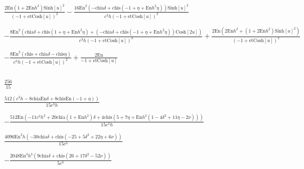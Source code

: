 \documentclass{article}
\begin{document}
\begin{doublespace}
\noindent\(\frac{2 \text{En} \left(1+2 \text{En} h^2\right) \text{Sinh}[u]^2}{(-1+\text{et} \text{Cosh}[u])^2}-\frac{16 \text{En}^2 \left(-\text{chia}
\delta +\text{chis} \left(-1+\eta +\text{En} h^2 \eta \right)\right) \text{Sinh}[u]^2}{c^3 h (-1+\text{et} \text{Cosh}[u])^2}\)
\end{doublespace}

\begin{doublespace}
\noindent\(-\frac{8 \text{En}^2 \left(\text{chia} \delta +\text{chis} \left(1+\eta +\text{En} h^2 \eta \right)+\left(-\text{chia} \delta +\text{chis}
\left(-1+\eta +\text{En} h^2 \eta \right)\right) \text{Cosh}[2 u]\right)}{c^3 h (-1+\text{et} \text{Cosh}[u])^2}+\frac{2 \text{En} \left(2 \text{En}
h^2+\left(1+2 \text{En} h^2\right) \text{Sinh}[u]^2\right)}{(-1+\text{et} \text{Cosh}[u])^2}\)
\end{doublespace}

\begin{doublespace}
\noindent\(-\frac{8 \text{En}^2 (\text{chis}+\text{chia} \delta -\text{chis} \eta )}{c^3 h (-1+\text{et} \text{Cosh}[u])^2}+\frac{2 \text{En}}{-1+\text{et}
\text{Cosh}[u]}\)
\end{doublespace}

\noindent\(\text{}\)

\begin{doublespace}
\noindent\(\frac{256}{15}\)
\end{doublespace}

\begin{doublespace}
\noindent\(\frac{512 \left(c^3 h-8 \text{chia} \text{En} \delta +8 \text{chis} \text{En} (-1+\eta )\right)}{15 c^3 h}\)
\end{doublespace}

\begin{doublespace}
\noindent\(-\frac{512 \text{En} \left(-11 c^3 h^3+20 \text{chia} \left(1+\text{En} h^2\right) \delta +4 \text{chis} \left(5+7 \eta +\text{En} h^2
\left(1-4 \delta ^2+11 \eta -2 \nu \right)\right)\right)}{15 c^3 h}\)
\end{doublespace}

\begin{doublespace}
\noindent\(\frac{4096 \text{En}^2 h \left(-30 \text{chia} \delta +\text{chis} \left(-25+5 \delta ^2+22 \eta +6 \nu \right)\right)}{15 c^3}\)
\end{doublespace}

\begin{doublespace}
\noindent\(-\frac{2048 \text{En}^3 h^3 \left(9 \text{chia} \delta +\text{chis} \left(26+17 \delta ^2-52 \nu \right)\right)}{5 c^3}\)
\end{doublespace}
\end{document}
